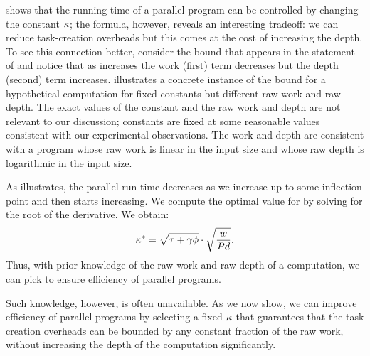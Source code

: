  shows that the running time of a parallel
program can be controlled by changing the constant ${\kappa}$; the
formula, however, reveals an interesting tradeoff: we can reduce
task-creation overheads but this comes at the cost of increasing the
depth.  To see this connection better, consider the bound
that appears in the statement of 
and notice that as \coff increases the work (first) term decreases
but the depth (second) term increases.  
illustrates a concrete instance of the bound for a hypothetical
computation for fixed constants but different raw work and raw depth.
The exact values of the constant and the raw work and depth are not
relevant to our discussion; constants are fixed at some reasonable
values consistent with our experimental observations.  The work and
depth are consistent with a program whose raw work is linear
in the input size
and whose raw depth is logarithmic in the input size.

As  illustrates, the parallel run time
decreases as we increase \coff up to some inflection point and then
starts increasing.  
We compute the optimal value for \coff by solving for the root of the  
derivative. We obtain:
\[
{\kappa}^* = \sqrt{{\tau}+{\gamma}{\phi}} \cdot
\sqrt{ \frac{w}{Pd} }.
\]
Thus, with prior knowledge of the raw work and raw depth of a
computation, we can pick \coff to ensure efficiency of parallel
programs.  

Such knowledge, however, is often unavailable.  As we now
show, we can improve efficiency of parallel programs by selecting a
fixed ${\kappa}$ that guarantees that the task creation overheads can be
bounded by any constant fraction of the raw work, without increasing
the depth of the computation significantly. 



